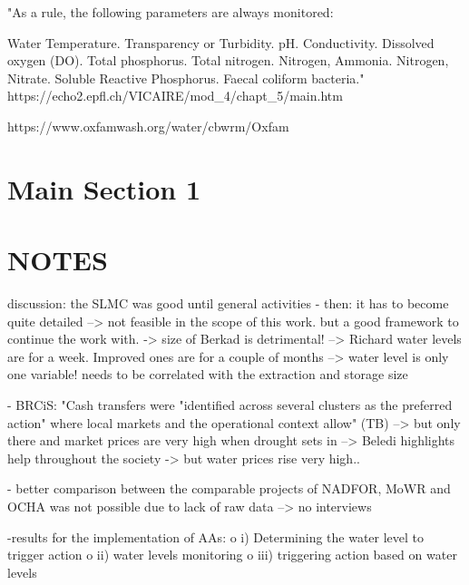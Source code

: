 "As a rule, the following parameters are always monitored:

Water Temperature.
Transparency or Turbidity.
pH.
Conductivity.
Dissolved oxygen (DO).
Total phosphorus.
Total nitrogen.
Nitrogen, Ammonia.
Nitrogen, Nitrate.
Soluble Reactive Phosphorus.
Faecal coliform bacteria." https://echo2.epfl.ch/VICAIRE/mod_4/chapt_5/main.htm

https://www.oxfamwash.org/water/cbwrm/Oxfam%

\section{Main Section 1}


\section{NOTES}

discussion: the SLMC was good until general activities - then: it has to become quite detailed --> not feasible in the scope of this work. but a good framework to continue the work with.
-> size of Berkad is detrimental! --> Richard water levels are for a week. Improved ones are for a couple of months --> water level is only one variable! needs to be correlated with the extraction and storage size

- BRCiS: "Cash transfers were "identified across several clusters as the preferred action" where local markets and the operational context allow" (TB) --> but only there and market prices are very high when drought sets in
--> Beledi highlights help throughout the society -> but water prices rise very high.. 

- better comparison between the comparable projects of NADFOR, MoWR and OCHA was not possible due to lack of raw data --> no interviews

-results for the implementation of AAs:
o	i) Determining the water level to trigger action
o	ii) water levels monitoring
o	iii) triggering action based on water levels

